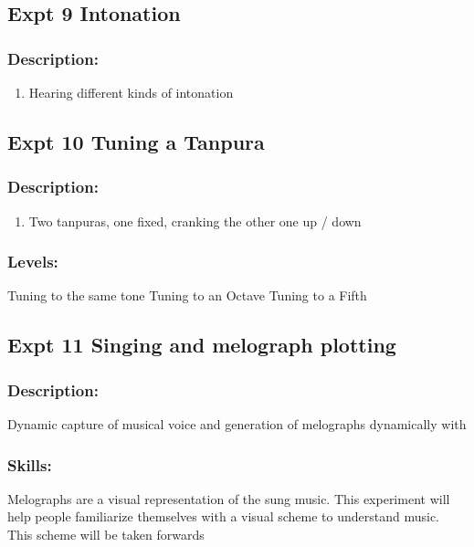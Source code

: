 \documentclass[11pt]{article}
\begin{document}
\subsection{Expt 9 Intonation}
\label{sec-1-10}
\subsubsection{Description:}
\label{sec-1-10-1}


\begin{enumerate}
\item Hearing different kinds of intonation
\end{enumerate}
   

      
\subsection{Expt 10 Tuning a Tanpura}
\label{sec-1-11}
\subsubsection{Description:}
\label{sec-1-11-1}

\begin{enumerate}
\item Two tanpuras, one fixed, cranking the other one up / down
\end{enumerate}
\subsubsection{Levels:}
\label{sec-1-11-2}

   Tuning to the same tone
   Tuning to an Octave
   Tuning to a Fifth
     
\subsection{Expt 11 Singing and melograph plotting}
\label{sec-1-12}
\subsubsection{Description:}
\label{sec-1-12-1}

Dynamic capture of musical voice and generation of melographs dynamically with 
\subsubsection{Skills:}
\label{sec-1-12-2}

Melographs are a visual representation of the sung music. This
experiment will help people familiarize themselves with a visual
scheme to understand music. This scheme will be taken forwards
\end{document}
